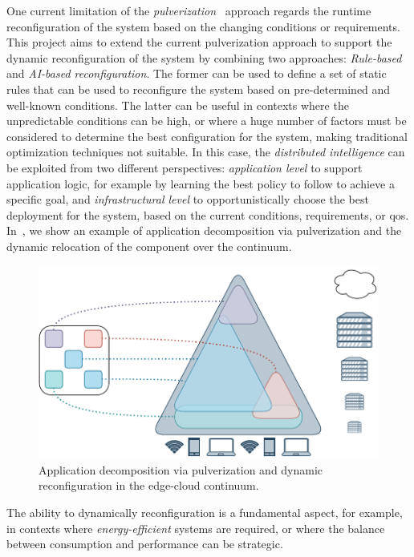 \documentclass[12pt,a4paper]{article}
\newcommand{\meta}[1]{{\color{blue}#1}}
\begin{document}
\meta{
One current limitation of the \emph{pulverization}~\cite{DBLP:journals/fi/CasadeiPPVW20} approach regards the runtime reconfiguration of the system based on the changing conditions or requirements.
%
This project aims to extend the current pulverization approach to support the dynamic reconfiguration of the system
by combining two approaches: \emph{Rule-based} and \emph{AI-based reconfiguration}.
%
The former can be used to define a set of static rules that can be used to reconfigure the system based on pre-determined and well-known conditions.
%
The latter can be useful in contexts where the unpredictable conditions can be high,
or where a huge number of factors must be considered to determine the best configuration for the system,
making traditional optimization techniques not suitable.
%
In this case,
the \emph{distributed intelligence} can be exploited from two different perspectives:
\emph{application level} to support application logic,
for example by learning the best policy to follow to achieve a specific goal,
and \emph{infrastructural level} to opportunistically choose the best deployment for the system,
based on the current conditions, requirements, or \ac{qos}.
%
In~\Cref{fig:ai-reconf},
we show an example of application decomposition via pulverization and the dynamic relocation of the component over the continuum.
%
\begin{figure}[ht]
	\centering
	\includegraphics[width=0.55\linewidth]{img/phd-proposal.drawio.pdf}
	\caption{Application decomposition via pulverization and dynamic reconfiguration in the edge-cloud continuum.}
	\label{fig:ai-reconf}
\end{figure}
%
The ability to dynamically reconfiguration is a fundamental aspect,
for example,
in contexts where \emph{energy-efficient} systems are required,
or where the balance between consumption and performance can be strategic.
}
\end{document}
